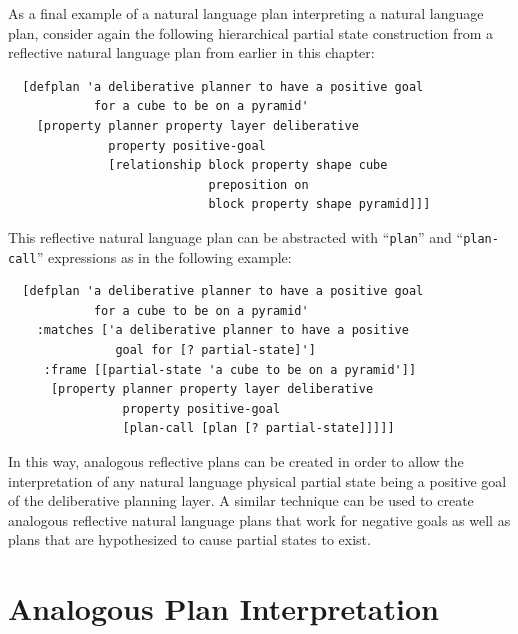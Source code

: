As a final example of a natural language plan interpreting a natural
language plan, consider again the following hierarchical partial state
construction from a reflective natural language plan from earlier in
this chapter:
\begin{samepage}
\begin{Verbatim}
  [defplan 'a deliberative planner to have a positive goal
            for a cube to be on a pyramid'
    [property planner property layer deliberative
              property positive-goal
              [relationship block property shape cube
                            preposition on
                            block property shape pyramid]]]
\end{Verbatim}
\end{samepage}
This reflective natural language plan can be abstracted with
``{\tt{plan}}'' and ``{\tt{plan-call}}'' expressions as in the
following example:
\begin{samepage}
\begin{Verbatim}
  [defplan 'a deliberative planner to have a positive goal
            for a cube to be on a pyramid'
    :matches ['a deliberative planner to have a positive
               goal for [? partial-state]']
     :frame [[partial-state 'a cube to be on a pyramid']]
      [property planner property layer deliberative
                property positive-goal
                [plan-call [plan [? partial-state]]]]]
\end{Verbatim}
\end{samepage}
In this way, analogous reflective plans can be created in order to
allow the interpretation of any natural language physical partial
state being a positive goal of the deliberative planning layer.  A
similar technique can be used to create analogous reflective natural
language plans that work for negative goals as well as plans that are
hypothesized to cause partial states to exist.

\section{Analogous Plan Interpretation}

